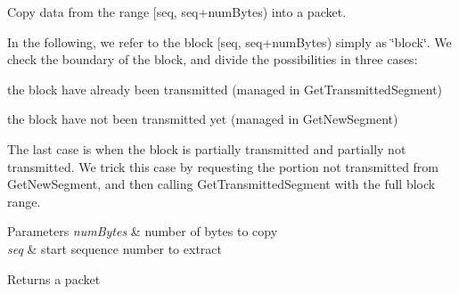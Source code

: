Copy data from the range \mbox{[}seq, seq+num\+Bytes) into a packet. 

In the following, we refer to the block \mbox{[}seq, seq+num\+Bytes) simply as \char`\"{}block\char`\"{}. We check the boundary of the block, and divide the possibilities in three cases\+:


\begin{DoxyItemize}
\item the block have already been transmitted (managed in Get\+Transmitted\+Segment)
\item the block have not been transmitted yet (managed in Get\+New\+Segment)
\end{DoxyItemize}

The last case is when the block is partially transmitted and partially not transmitted. We trick this case by requesting the portion not transmitted from Get\+New\+Segment, and then calling Get\+Transmitted\+Segment with the full block range.


\begin{DoxyParams}{Parameters}
{\em num\+Bytes} & number of bytes to copy \\
\hline
{\em seq} & start sequence number to extract \\
\hline
\end{DoxyParams}
\begin{DoxyReturn}{Returns}
a packet 
\end{DoxyReturn}


